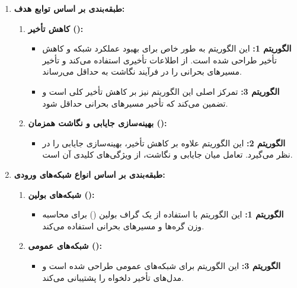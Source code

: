 \begin{qsolve}
	\begin{enumerate}
		\item \textbf{طبقه‌بندی بر اساس توابع هدف:}
		\begin{enumerate}
			\item \textbf{کاهش تأخیر ():}
			\begin{itemize}
				\item \textbf{الگوریتم 1: }
				\newline
				این الگوریتم به طور خاص برای بهبود عملکرد شبکه و کاهش تأخیر طراحی شده است. از اطلاعات تأخیری استفاده می‌کند و تأخیر مسیرهای بحرانی را در فرآیند نگاشت به حداقل می‌رساند.
				
				\item \textbf{الگوریتم 3: }
				\newline
				تمرکز اصلی این الگوریتم نیز بر کاهش تأخیر کلی است و تضمین می‌کند که تأخیر مسیرهای بحرانی حداقل شود.
			\end{itemize}
			
			\item \textbf{بهینه‌سازی جایابی و نگاشت همزمان ():}
			\begin{itemize}
				\item \textbf{الگوریتم 2: }
				\newline
				این الگوریتم علاوه بر کاهش تأخیر، بهینه‌سازی جایابی را در نظر می‌گیرد. تعامل میان جایابی و نگاشت، از ویژگی‌های کلیدی آن است.
			\end{itemize}
		\end{enumerate}
		
		\item \textbf{طبقه‌بندی بر اساس انواع شبکه‌های ورودی:}
		\begin{enumerate}
			\item \textbf{شبکه‌های بولین ():}
			\begin{itemize}
				\item \textbf{الگوریتم 1:}
				\newline
				این الگوریتم با استفاده از یک گراف بولین () برای محاسبه وزن گره‌ها و مسیرهای بحرانی استفاده می‌کند.
			\end{itemize}
			
			\item \textbf{شبکه‌های عمومی ():}
			\begin{itemize}
				\item \textbf{الگوریتم 3:}
				\newline
				این الگوریتم برای شبکه‌های عمومی طراحی شده است و مدل‌های تأخیر دلخواه را پشتیبانی می‌کند.
			\end{itemize}
			

\end{enumerate}
\end{enumerate}
\end{qsolve}

